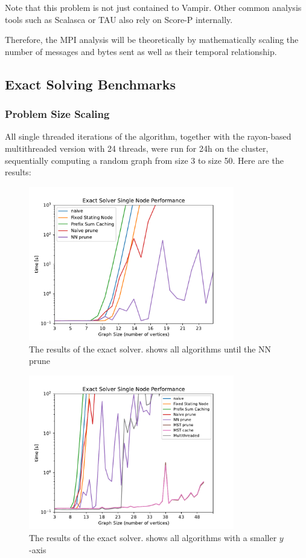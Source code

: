 Note that this problem is not just contained to Vampir. Other common analysis tools such as Scalasca \cite{noauthor_scalasca_nodate} or TAU \cite{noauthor_tau_nodate} also rely on Score-P internally.

Therefore, the \ac{MPI} analysis will be theoretically by mathematically scaling the number of messages and bytes sent as well 
as their temporal relationship.

\subsection{Exact Solving Benchmarks}

\subsubsection{Problem Size Scaling}

All single threaded iterations of the algorithm, together with the rayon-based multithreaded version with 24 threads, were run for 24h on the cluster, sequentially computing a random graph from size 3 to size 50. Here are the results:
\begin{figure}[H]
    \centering
\includegraphics[width=0.8\textwidth]{./assets/exact-stmt1.pdf}
\caption{} %
    \caption{The results of the exact solver. shows all algorithms until the NN prune}
\end{figure}

\begin{figure}[H]
    \centering
\includegraphics[width=0.8\textwidth]{./assets/exact-stmt.pdf}
\caption{} %
    \caption{The results of the exact solver. shows all algorithms with a smaller $y$-axis}
\end{figure}

